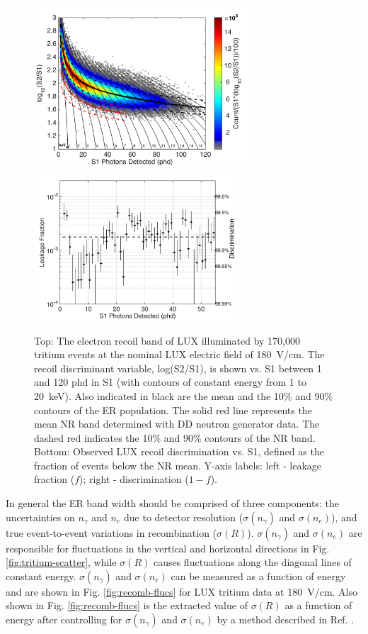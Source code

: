 \begin{figure}[h!]
\includegraphics[width=80mm]{fig/CH3T_ER_Band.png}
\includegraphics[width=75mm]{fig/CH3T_Leakage_Run03.png}
\caption{Top: The electron recoil band of LUX illuminated by 170,000 tritium events at the nominal LUX electric field of 180~V/cm.  The recoil discriminant variable, log(S2/S1), is shown vs. S1 between 1 and 120 phd in S1 (with contours of constant energy from 1 to 20~keV). Also indicated in black are the mean and the 10\% and 90\% contours of the ER population. The solid red line represents the mean NR band determined with DD neutron generator data. The dashed red indicates the 10\% and 90\% contours of the NR band. Bottom: Observed LUX recoil discrimination vs. S1, defined as the fraction of events below the NR mean. Y-axis labels: left -  leakage fraction ($f$); right - discrimination ($1-f$).}
\label{fig:ER_band}
\end{figure}

In general the ER band width should be comprised of three components: the uncertainties on  $n_{\gamma}$ and $n_e$  due to detector resolution ($ \sigma(n_{\gamma})$ and $ \sigma(n_e)$), and true event-to-event variations in recombination ($ \sigma(R)$). $ \sigma(n_{\gamma})$ and $ \sigma(n_e)$ are responsible for fluctuations in the vertical  and horizontal directions in Fig. \ref{fig:tritium-scatter},  while $ \sigma(R)$ causes fluctuations along the diagonal lines of constant energy. $ \sigma(n_{\gamma})$ and $ \sigma(n_e)$ can be measured as a function of energy and are shown in Fig. \ref{fig:recomb-flucs} for LUX tritium data at 180~V/cm\cite{Dobi_Thesis}. Also shown in Fig. \ref{fig:recomb-flucs} is the extracted value of $ \sigma(R)$ as a function of energy after controlling for $ \sigma(n_{\gamma})$ and $ \sigma(n_e)$ by a method described in Ref. \cite{Dobi_Thesis}. 

